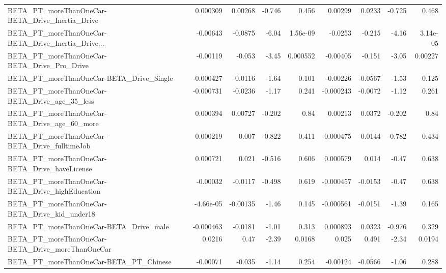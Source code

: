 \begin{tabular}{lrrrrrrrr}
BETA\_PT\_moreThanOneCar-BETA\_Drive\_Inertia\_Drive    &    0.000309 &      0.00268 &   -0.746 &    0.456 &    0.00299 &      0.0233 &       -0.725 &         0.468 \\
BETA\_PT\_moreThanOneCar-BETA\_Drive\_Inertia\_Drive... &    -0.00643 &      -0.0875 &    -6.04 & 1.56e-09 &    -0.0253 &      -0.215 &        -4.16 &      3.14e-05 \\
BETA\_PT\_moreThanOneCar-BETA\_Drive\_Pro\_Drive        &    -0.00119 &       -0.053 &    -3.45 & 0.000552 &   -0.00405 &      -0.151 &        -3.05 &       0.00227 \\
BETA\_PT\_moreThanOneCar-BETA\_Drive\_Single           &   -0.000427 &      -0.0116 &    -1.64 &    0.101 &   -0.00226 &     -0.0567 &        -1.53 &         0.125 \\
BETA\_PT\_moreThanOneCar-BETA\_Drive\_age\_35\_less      &   -0.000731 &      -0.0236 &    -1.17 &    0.241 &  -0.000243 &     -0.0072 &        -1.12 &         0.261 \\
BETA\_PT\_moreThanOneCar-BETA\_Drive\_age\_60\_more      &    0.000394 &      0.00727 &   -0.202 &     0.84 &    0.00213 &      0.0372 &       -0.202 &          0.84 \\
BETA\_PT\_moreThanOneCar-BETA\_Drive\_fulltimeJob      &    0.000219 &        0.007 &   -0.822 &    0.411 &  -0.000475 &     -0.0144 &       -0.782 &         0.434 \\
BETA\_PT\_moreThanOneCar-BETA\_Drive\_haveLicense      &    0.000721 &        0.021 &   -0.516 &    0.606 &   0.000579 &       0.014 &        -0.47 &         0.638 \\
BETA\_PT\_moreThanOneCar-BETA\_Drive\_highEducation    &    -0.00032 &      -0.0117 &   -0.498 &    0.619 &  -0.000457 &     -0.0153 &        -0.47 &         0.638 \\
BETA\_PT\_moreThanOneCar-BETA\_Drive\_kid\_under18      &   -4.66e-05 &     -0.00135 &    -1.46 &    0.145 &  -0.000561 &     -0.0151 &        -1.39 &         0.165 \\
BETA\_PT\_moreThanOneCar-BETA\_Drive\_male             &   -0.000463 &      -0.0181 &    -1.01 &    0.313 &   0.000893 &      0.0323 &       -0.976 &         0.329 \\
BETA\_PT\_moreThanOneCar-BETA\_Drive\_moreThanOneCar   &      0.0216 &         0.47 &    -2.39 &   0.0168 &      0.025 &       0.491 &        -2.34 &        0.0194 \\
BETA\_PT\_moreThanOneCar-BETA\_PT\_Chinese             &    -0.00071 &       -0.035 &    -1.14 &    0.254 &   -0.00124 &     -0.0566 &        -1.06 &         0.288 \\

\end{tabular}
